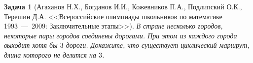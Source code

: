\documentclass[12pt,a4paper,fleqn]{article}
\newtheorem{exersize}{Задача}
\begin{document}
\begin{exersize}[Агаханов Н.Х., Богданов И.И., Кожевников П.А., Подлипский О.К., Терешин Д.А. <<Всероссийские олимпиады школьников по математике 1993~---~2009: Заключительные этапы>>]
	В стране несколько городов, некоторые пары городов соединены дорогами. При этом из каждого города выходит хотя бы $3$ дороги. Докажите, что существует циклический маршрут, длина которого не делится на $3$.
\end{exersize}	 
\end{document}
